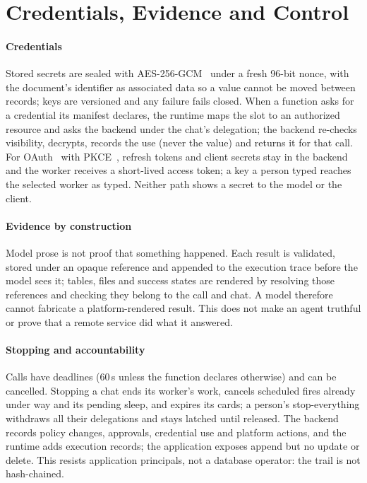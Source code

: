 \documentclass[10pt,twocolumn,a4paper]{article}
\begin{document}
\section{Credentials, Evidence and Control}
\label{sec:secrets}

\paragraph{Credentials}
Stored secrets are sealed with AES-256-GCM~\cite{nist80038d} under a
fresh 96-bit nonce, with the document's identifier as associated data
so a value cannot be moved between records; keys are versioned and any
failure fails closed. When a function asks for a credential its
manifest declares, the runtime maps the slot to an authorized resource
and asks the backend under the chat's delegation; the backend re-checks
visibility, decrypts, records the use (never the value) and returns it
for that call. For OAuth~\cite{rfc6749} with PKCE~\cite{rfc7636}, refresh
tokens and client secrets stay in the backend and the worker receives a
short-lived access token; a key a person typed reaches the selected
worker as typed. Neither path shows a secret to the model or the client.

\paragraph{Evidence by construction}
Model prose is not proof that something happened. Each result is
validated, stored under an opaque reference and appended to the
execution trace before the model sees it; tables, files and success
states are rendered by resolving those references and checking they
belong to the call and chat. A model therefore cannot fabricate a
platform-rendered result. This does not make an agent truthful or prove
that a remote service did what it answered.

\paragraph{Stopping and accountability}
Calls have deadlines (60\,s unless the function declares otherwise)
and can be cancelled. Stopping a chat ends its worker's work, cancels
scheduled fires already under way and its pending sleep, and expires its
cards; a person's stop-everything
withdraws all their delegations and stays latched until released. The
backend records policy changes, approvals, credential use and platform
actions, and the runtime adds execution records; the application exposes
append but no update or delete. This resists application principals,
not a database operator: the trail is not hash-chained.
\end{document}
